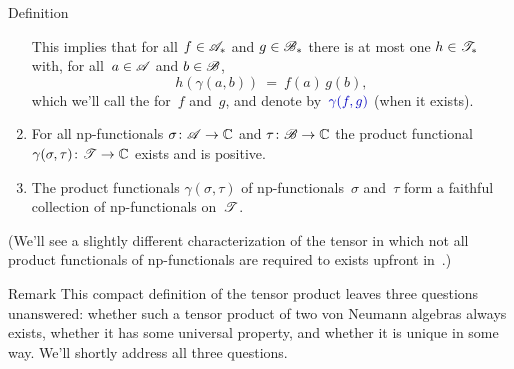 \documentclass[a]{subfiles}
\begin{document}
\begin{parsec}
\begin{point}[tensor]{Definition}
\begin{enumerate}
This implies
that for all $f \in \mathscr{A}_*$
and $g\in \mathscr{B}_*$
there is at most one $h\in \mathscr{T}_*$
with, for all~$a\in\mathscr{A}$ and $b\in\mathscr{B}$,
\begin{equation*}
	h(\gamma(a,b))\ =\  f(a)\,g(b),
\end{equation*}
which we'll call the 
for~$f$ and~$g$,
and denote by~$\Define{\gamma(f,g)}$
(when it exists).
\item
\label{tensor-2}
For all np-functionals
$\sigma\colon \mathscr{A}\to\mathbb{C}$
and $\tau\colon \mathscr{B}\to\mathbb{C}$
the product functional $\gamma(\sigma,\tau)\colon \mathscr{T}\to\mathbb{C}$
exists and is positive.
\item
\label{tensor-3}
The product functionals 
$\gamma(\sigma,\tau)$
of np-functionals~$\sigma$ and~$\tau$ form a faithful collection
of np-functionals on~$\mathscr{T}$.
\end{enumerate}
(We'll see a slightly different characterization
of the tensor
in which not all product functionals of np-functionals
are required to exists upfront 
in~.)
\end{point}
\begin{point}{Remark}%
This compact definition of the tensor product
leaves three questions unanswered:
whether such a tensor product of two von Neumann algebras
always exists,
whether it has some  universal property,
and whether it is unique in some way.
We'll shortly address all three questions.
\end{point}
\end{parsec}
\end{document}
